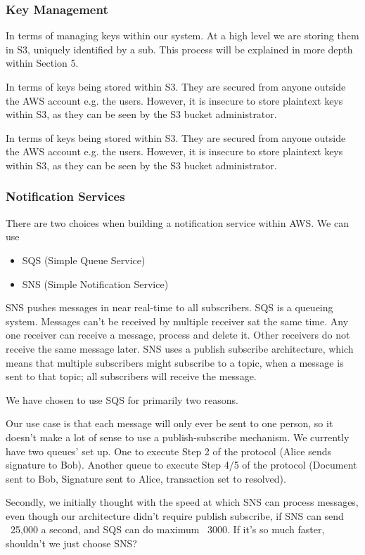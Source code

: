 \documentclass[runningheads]{llncs}
\begin{document}
\subsubsection{Key Management}
In terms of managing keys within our system. At a high level we are storing them in S3, uniquely identified by a sub. This process will be explained in more depth within Section 5.

In terms of keys being stored within S3. They are secured from anyone outside the AWS account e.g. the users. However, it is insecure to store plaintext keys within S3, as they can be seen by the S3 bucket administrator.

In terms of keys being stored within S3. They are secured from anyone outside the AWS account e.g. the users. However, it is insecure to store plaintext keys within S3, as they can be seen by the S3 bucket administrator.

\subsubsection{Notification Services}
There are two choices when building a notification service within AWS. We can use

\begin{itemize}
	\item SQS (Simple Queue Service)
	\item SNS (Simple Notification Service)
\end{itemize}

SNS pushes messages in near real-time to all subscribers. SQS is a queueing system. Messages can't be received by multiple receiver sat the same time. Any one receiver can receive a message, process and delete it. Other receivers do not receive the same message later. SNS uses a publish subscribe architecture, which means that multiple subscribers might subscribe to a topic, when a message is sent to that topic; all subscribers will receive the message.

We have chosen to use SQS for primarily two reasons.

Our use case is that each message will only ever be sent to one person, so it doesn't make a lot of sense to use a publish-subscribe mechanism. We currently have two queues' set up. One to execute Step 2 of the protocol (Alice sends signature to Bob). Another queue to execute Step 4/5 of the protocol (Document sent to Bob, Signature sent to Alice, transaction set to resolved).

Secondly, we initially thought with the speed at which SNS can process messages, even though our architecture didn't require publish subscribe, if SNS can send ~25,000 a second, and SQS can do maximum ~3000. If it's so much faster, shouldn't we just choose SNS?
\end{document}
